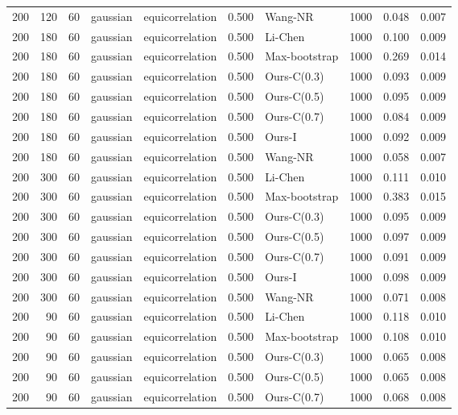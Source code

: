 \begin{tabular}{rrrllrlrrr}
200 & 120 & 60 & gaussian & equicorrelation & 0.500 & Wang-NR & 1000 & 0.048 & 0.007 \\
200 & 180 & 60 & gaussian & equicorrelation & 0.500 & Li-Chen & 1000 & 0.100 & 0.009 \\
200 & 180 & 60 & gaussian & equicorrelation & 0.500 & Max-bootstrap & 1000 & 0.269 & 0.014 \\
200 & 180 & 60 & gaussian & equicorrelation & 0.500 & Ours-C(0.3) & 1000 & 0.093 & 0.009 \\
200 & 180 & 60 & gaussian & equicorrelation & 0.500 & Ours-C(0.5) & 1000 & 0.095 & 0.009 \\
200 & 180 & 60 & gaussian & equicorrelation & 0.500 & Ours-C(0.7) & 1000 & 0.084 & 0.009 \\
200 & 180 & 60 & gaussian & equicorrelation & 0.500 & Ours-I & 1000 & 0.092 & 0.009 \\
200 & 180 & 60 & gaussian & equicorrelation & 0.500 & Wang-NR & 1000 & 0.058 & 0.007 \\
200 & 300 & 60 & gaussian & equicorrelation & 0.500 & Li-Chen & 1000 & 0.111 & 0.010 \\
200 & 300 & 60 & gaussian & equicorrelation & 0.500 & Max-bootstrap & 1000 & 0.383 & 0.015 \\
200 & 300 & 60 & gaussian & equicorrelation & 0.500 & Ours-C(0.3) & 1000 & 0.095 & 0.009 \\
200 & 300 & 60 & gaussian & equicorrelation & 0.500 & Ours-C(0.5) & 1000 & 0.097 & 0.009 \\
200 & 300 & 60 & gaussian & equicorrelation & 0.500 & Ours-C(0.7) & 1000 & 0.091 & 0.009 \\
200 & 300 & 60 & gaussian & equicorrelation & 0.500 & Ours-I & 1000 & 0.098 & 0.009 \\
200 & 300 & 60 & gaussian & equicorrelation & 0.500 & Wang-NR & 1000 & 0.071 & 0.008 \\
200 & 90 & 60 & gaussian & equicorrelation & 0.500 & Li-Chen & 1000 & 0.118 & 0.010 \\
200 & 90 & 60 & gaussian & equicorrelation & 0.500 & Max-bootstrap & 1000 & 0.108 & 0.010 \\
200 & 90 & 60 & gaussian & equicorrelation & 0.500 & Ours-C(0.3) & 1000 & 0.065 & 0.008 \\
200 & 90 & 60 & gaussian & equicorrelation & 0.500 & Ours-C(0.5) & 1000 & 0.065 & 0.008 \\
200 & 90 & 60 & gaussian & equicorrelation & 0.500 & Ours-C(0.7) & 1000 & 0.068 & 0.008 \\

\end{tabular}
